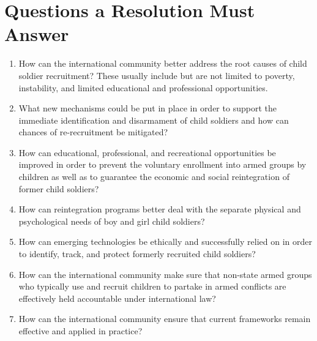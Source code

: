 \section{Questions a Resolution Must Answer}


\begin{enumerate}
  \item \textbf{} How can the international community better address the root causes of child soldier recruitment? These usually include but are not limited to poverty, instability, and limited educational and professional opportunities.
  \item \textbf{} What new mechanisms could be put in place in order to support the immediate identification and disarmament of child soldiers and how can chances of re-recruitment be mitigated?
  \item \textbf{} How can educational, professional, and recreational opportunities be improved in order to prevent the voluntary enrollment into armed groups by children as well as to guarantee the economic and social reintegration of former child soldiers?
  \item \textbf{} How can reintegration programs better deal with the separate physical and psychological needs of boy and girl child soldiers?
  \item \textbf{} How can emerging technologies be ethically and successfully relied on in order to identify, track, and protect formerly recruited child soldiers?
  \item \textbf{} How can the international community make sure that non-state armed groups who typically use and recruit children to partake in armed conflicts are effectively held accountable under international law?
  \item \textbf{} How can the international community ensure that current frameworks remain effective and applied in practice?
\end{enumerate}
